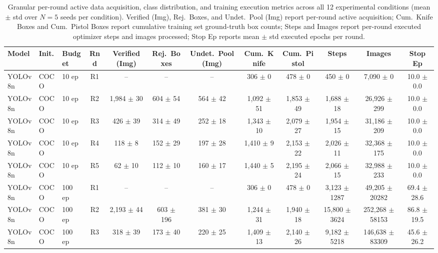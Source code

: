 \begin{table}[hbt!]
\caption{Granular per-round active data acquisition, class distribution, and training execution metrics across all 12 experimental conditions (mean $\pm$ std over $N=5$ seeds per condition). Verified (Img), Rej.\ Boxes, and Undet.\ Pool (Img) report per-round active acquisition; Cum.\ Knife Boxes and Cum.\ Pistol Boxes report cumulative training set ground-truth box counts; Steps and Images report per-round executed optimizer steps and images processed; Stop Ep reports mean $\pm$ std executed epochs per round.}%
\label{tab:supp_per_round}
\centering
\tiny
\setlength{\tabcolsep}{1.8pt}
\begin{tabular}{lllccccccccc}
\toprule
\textbf{Model} & \textbf{Init.} & \textbf{Budget} & \textbf{Rnd} & \textbf{Verified (Img)} & \textbf{Rej.\ Boxes} & \textbf{Undet.\ Pool (Img)} & \textbf{Cum.\ Knife} & \textbf{Cum.\ Pistol} & \textbf{Steps} & \textbf{Images} & \textbf{Stop Ep} \\
\midrule
YOLOv8n & COCO & 10 ep & R1 & {--} & {--} & {--} & 306 $\pm$ 0 & 478 $\pm$ 0 & 450 $\pm$ 0 & 7,090 $\pm$ 0 & 10.0 $\pm$ 0.0 \\
YOLOv8n & COCO & 10 ep & R2 & 1,984 $\pm$ 30 & 604 $\pm$ 54 & 564 $\pm$ 42 & 1,092 $\pm$ 51 & 1,853 $\pm$ 49 & 1,688 $\pm$ 18 & 26,926 $\pm$ 299 & 10.0 $\pm$ 0.0 \\
YOLOv8n & COCO & 10 ep & R3 & 426 $\pm$ 39 & 314 $\pm$ 49 & 252 $\pm$ 18 & 1,343 $\pm$ 10 & 2,079 $\pm$ 27 & 1,954 $\pm$ 15 & 31,186 $\pm$ 209 & 10.0 $\pm$ 0.0 \\
YOLOv8n & COCO & 10 ep & R4 & 118 $\pm$ 8 & 152 $\pm$ 29 & 197 $\pm$ 28 & 1,410 $\pm$ 9 & 2,153 $\pm$ 22 & 2,026 $\pm$ 11 & 32,368 $\pm$ 175 & 10.0 $\pm$ 0.0 \\
YOLOv8n & COCO & 10 ep & R5 & 62 $\pm$ 10 & 112 $\pm$ 10 & 160 $\pm$ 17 & 1,440 $\pm$ 5 & 2,195 $\pm$ 24 & 2,066 $\pm$ 15 & 32,988 $\pm$ 233 & 10.0 $\pm$ 0.0 \\
\midrule
YOLOv8n & COCO & 100 ep & R1 & {--} & {--} & {--} & 306 $\pm$ 0 & 478 $\pm$ 0 & 3,123 $\pm$ 1287 & 49,205 $\pm$ 20282 & 69.4 $\pm$ 28.6 \\
YOLOv8n & COCO & 100 ep & R2 & 2,193 $\pm$ 44 & 603 $\pm$ 196 & 381 $\pm$ 30 & 1,244 $\pm$ 31 & 1,940 $\pm$ 18 & 15,800 $\pm$ 3624 & 252,268 $\pm$ 58153 & 86.8 $\pm$ 19.5 \\
YOLOv8n & COCO & 100 ep & R3 & 318 $\pm$ 39 & 173 $\pm$ 40 & 220 $\pm$ 25 & 1,409 $\pm$ 13 & 2,140 $\pm$ 26 & 9,182 $\pm$ 5218 & 146,638 $\pm$ 83309 & 45.6 $\pm$ 26.2 \\

\end{tabular}
\end{table}

